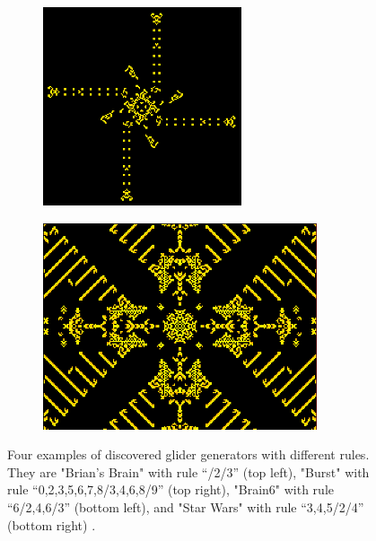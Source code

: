 \documentclass[12pt]{article}
\numberwithin{figure}{section} %
\begin{document}
\begin{figure}[H]
\begin{subfigure}{0.42\textwidth}
     		\includegraphics[width=\linewidth]{Section1/8.3}
     		\subcaption{}
   	\end{subfigure}
     	\begin{subfigure}{0.56\textwidth}
     	\centering
     		\includegraphics[width=\linewidth]{Section1/8.4}
     		\subcaption{}
   	\end{subfigure}
   	\caption[Examples of famous gliders]{Four examples of discovered glider generators with different rules. They are "Brian’s Brain" with rule “/2/3” (top left), "Burst" with rule “0,2,3,5,6,7,8/3,4,6,8/9” (top right), "Brain6" with rule “6/2,4,6/3” (bottom left), and "Star Wars" with rule “3,4,5/2/4” (bottom right) \cite{Lexicon}.}
   	\label{fig:famous gliders}
   	\vspace{-1.5em}
\end{figure}
\end{document}
